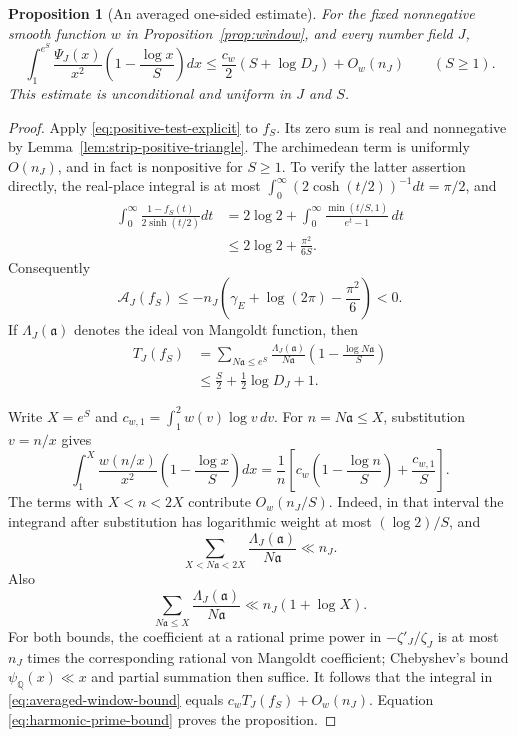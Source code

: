 \documentclass[11pt]{article}
\newtheorem{proposition}[theorem]{Proposition}
\theoremstyle{definition}
\theoremstyle{remark}
\begin{document}
\begin{proposition}[An averaged one-sided estimate]
\label{prop:averaged-window}
For the fixed nonnegative smooth function $w$ in
Proposition~\ref{prop:window}, and every number field $J$,
\begin{equation}\label{eq:averaged-window-bound}
 \int_1^{e^S}\frac{\Psi_J(x)}{x^2}
       \left(1-\frac{\log x}{S}\right)dx
 \leq\frac{c_w}{2}(S+\log D_J)+O_w(n_J)
 \qquad(S\geq1).
\end{equation}
This estimate is unconditional and uniform in $J$ and $S$.
\end{proposition}
\begin{proof}
Apply \eqref{eq:positive-test-explicit} to $f_S$.
Its zero sum is real and nonnegative by
Lemma~\ref{lem:strip-positive-triangle}.
The archimedean term is uniformly $O(n_J)$, and in fact is
nonpositive for $S\geq1$.  To verify the latter assertion directly,
the real-place integral is at most
$\int_0^\infty(2\cosh(t/2))^{-1}dt=\pi/2$, and
\begin{align*}
 \int_0^\infty\frac{1-f_S(t)}{2\sinh(t/2)}dt
 &=2\log2+\int_0^\infty
       \frac{\min(t/S,1)}{e^t-1}\,dt\\
 &\leq2\log2+\frac{\pi^2}{6S}.
\end{align*}
Consequently
\[
 \mathcal A_J(f_S)
 \leq-n_J\left(\gamma_{\!E}+\log(2\pi)
                         -\frac{\pi^2}{6}\right)<0.
\]
If $\Lambda_J(\mathfrak a)$ denotes the ideal von Mangoldt
function, then
\begin{equation}\label{eq:harmonic-prime-bound}
 \begin{split}
 T_J(f_S)
 &=\sum_{N\mathfrak a\leq e^S}
   \frac{\Lambda_J(\mathfrak a)}{N\mathfrak a}
       \left(1-\frac{\log N\mathfrak a}{S}\right)\\
 &\leq\frac S2+\frac12\log D_J+1.
 \end{split}
\end{equation}

Write $X=e^S$ and $c_{w,1}=\int_1^2w(v)\log v\,dv$.
For $n=N\mathfrak a\leq X$, substitution $v=n/x$ gives
\[
 \int_1^X\frac{w(n/x)}{x^2}
       \left(1-\frac{\log x}{S}\right)dx
 =\frac1n\left[c_w\left(1-\frac{\log n}{S}\right)
                         +\frac{c_{w,1}}S\right].
\]
The terms with $X<n<2X$ contribute $O_w(n_J/S)$.
Indeed, in that interval the integrand after substitution has
logarithmic weight at most $(\log2)/S$, and
\[
 \sum_{X<N\mathfrak a<2X}
       \frac{\Lambda_J(\mathfrak a)}{N\mathfrak a}\ll n_J.
\]
Also
\[
 \sum_{N\mathfrak a\leq X}
       \frac{\Lambda_J(\mathfrak a)}{N\mathfrak a}
       \ll n_J(1+\log X).
\]
For both bounds, the coefficient at a rational prime power in
$-\zeta'_J/\zeta_J$ is at most $n_J$ times the corresponding
rational von Mangoldt coefficient; Chebyshev's bound
$\psi_{\mathbb Q}(x)\ll x$ and partial summation then suffice.
It follows that the integral in \eqref{eq:averaged-window-bound}
equals $c_wT_J(f_S)+O_w(n_J)$.  Equation
\eqref{eq:harmonic-prime-bound} proves the proposition.
\end{proof}
\end{document}

